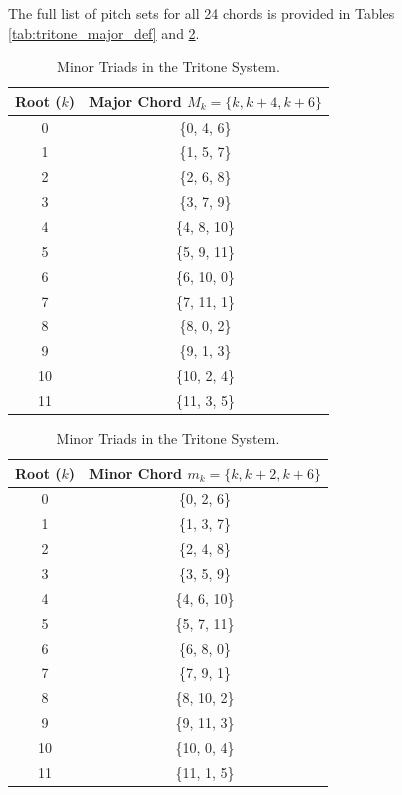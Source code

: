\documentclass[12pt,letterpaper]{amsart}
\begin{document}
The full list of pitch sets for all 24 chords is provided in Tables \ref{tab:tritone_major_def} and \ref{tab:tritone_minor_def}.

\begin{table}[H]
\centering
\scriptsize
\renewcommand{\arraystretch}{1.2}
\begin{minipage}{0.48\textwidth}
\centering
\begin{tabular}{|c|c|}
\hline
\textbf{Root} ($k$) & \textbf{Major Chord} $M_k = \{k, k+4, k+6\}$ \\
\hline
0 & \{0, 4, 6\} \\
1 & \{1, 5, 7\} \\
2 & \{2, 6, 8\} \\
3 & \{3, 7, 9\} \\
4 & \{4, 8, 10\} \\
5 & \{5, 9, 11\} \\
6 & \{6, 10, 0\} \\
7 & \{7, 11, 1\} \\
8 & \{8, 0, 2\} \\
9 & \{9, 1, 3\} \\
10 & \{10, 2, 4\} \\
11 & \{11, 3, 5\} \\
\hline
\end{tabular}
\caption{Major Triads in the Tritone System.}
\label{tab:tritone_major_def}
\end{minipage}
\hfill
\begin{minipage}{0.48\textwidth}
\centering
\begin{tabular}{|c|c|}
\hline
\textbf{Root} ($k$) & \textbf{Minor Chord} $m_k = \{k, k+2, k+6\}$ \\
\hline
0 & \{0, 2, 6\} \\
1 & \{1, 3, 7\} \\
2 & \{2, 4, 8\} \\
3 & \{3, 5, 9\} \\
4 & \{4, 6, 10\} \\
5 & \{5, 7, 11\} \\
6 & \{6, 8, 0\} \\
7 & \{7, 9, 1\} \\
8 & \{8, 10, 2\} \\
9 & \{9, 11, 3\} \\
10 & \{10, 0, 4\} \\
11 & \{11, 1, 5\} \\
\hline
\end{tabular}
\caption{Minor Triads in the Tritone System.}
\label{tab:tritone_minor_def}
\end{minipage}
\end{table}
\end{document}
